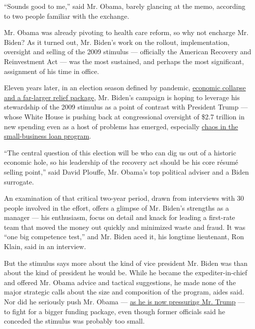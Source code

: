 ``Sounds good to me,'' said Mr. Obama, barely glancing at the memo,
according to two people familiar with the exchange.

Mr. Obama was already pivoting to health care reform, so why not
encharge Mr. Biden? As it turned out, Mr. Biden's work on the rollout,
implementation, oversight and selling of the 2009 stimulus ---
officially the American Recovery and Reinvestment Act --- was the most
sustained, and perhaps the most significant, assignment of his time in
office.

Eleven years later, in an election season defined by pandemic,
\href{https://www.nytimes3xbfgragh.onion/2020/06/11/us/politics/joe-biden-campaign-economy.html}{economic
collapse and a far-larger relief package}, Mr. Biden's campaign is
hoping to leverage his stewardship of the 2009 stimulus as a point of
contrast with President Trump --- whose White House is pushing back at
congressional oversight of \$2.7 trillion in new spending even as a host
of problems has emerged, especially
\href{https://www.nytimes3xbfgragh.onion/2020/04/26/business/ppp-small-business-loans.html}{chaos
in the small-business loan program}.

``The central question of this election will be who can dig us out of a
historic economic hole, so his leadership of the recovery act should be
his core résumé selling point,'' said David Plouffe, Mr. Obama's top
political adviser and a Biden surrogate.

An examination of that critical two-year period, drawn from interviews
with 30 people involved in the effort, offers a glimpse of Mr. Biden's
strengths as a manager --- his enthusiasm, focus on detail and knack for
leading a first-rate team that moved the money out quickly and minimized
waste and fraud. It was ``one big competence test,'' and Mr. Biden aced
it, his longtime lieutenant, Ron Klain, said in an interview.

But the stimulus says more about the kind of vice president Mr. Biden
was than about the kind of president he would be. While he became the
expediter-in-chief and offered Mr. Obama advice and tactical
suggestions, he made none of the major strategic calls about the size
and composition of the program, aides said. Nor did he seriously push
Mr. Obama ---
\href{https://www.politico.com/news/2020/04/25/joe-biden-green-stimulus-207848}{as
he is now pressuring Mr. Trump} --- to fight for a bigger funding
package, even though former officials said he conceded the stimulus was
probably too small.


